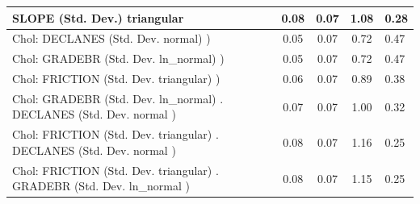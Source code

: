 \begin{table}
\begin{center}
\begin{tabular}{|l|l|c|c|c|l|}
			\hline
			SLOPE (Std. Dev.) triangular &  & 0.08 & 0.07 & 1.08 & 0.28 \\
			\hline
			 Chol: DECLANES (Std. Dev. normal) ) &  & 0.05 & 0.07 & 0.72 & 0.47 \\
			\hline
			 Chol: GRADEBR (Std. Dev. ln_normal) ) &  & 0.05 & 0.07 & 0.72 & 0.47 \\
			\hline
			 Chol: FRICTION (Std. Dev. triangular) ) &  & 0.06 & 0.07 & 0.89 & 0.38 \\
			\hline
			 Chol: GRADEBR (Std. Dev. ln_normal) . DECLANES (Std. Dev.   normal ) &  & 0.07 & 0.07 & 1.00 & 0.32 \\
			\hline
			 Chol: FRICTION (Std. Dev. triangular) . DECLANES (Std. Dev.   normal ) &  & 0.08 & 0.07 & 1.16 & 0.25 \\
			\hline
			 Chol: FRICTION (Std. Dev. triangular) . GRADEBR (Std. Dev.   ln_normal ) &  & 0.08 & 0.07 & 1.15 & 0.25 \\
			\hline
		\end{tabular}
	\end{center}
\end{table}